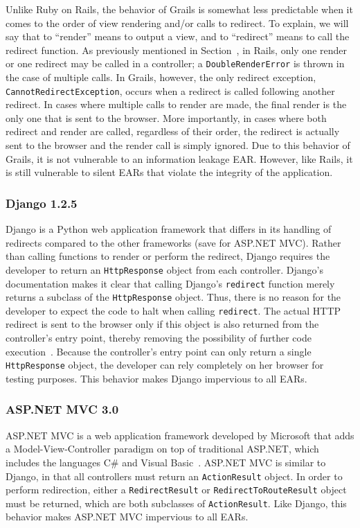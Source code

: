 Unlike Ruby on Rails, the behavior of Grails is somewhat less predictable
when it comes to the order of view rendering and/or calls to redirect. To
explain, we will say that to ``render'' means to output a view, and to
``redirect'' means to call the redirect function. As previously mentioned
in Section~, in Rails, only one render or one redirect may be
called in a controller; a \texttt{DoubleRenderError} is thrown in the case
of multiple calls. In Grails, however, the only redirect exception,
\texttt{Cannot\-Redirect\-Exception}, occurs when a redirect is called
following another redirect. In cases where multiple calls to render are
made, the final render is the only one that is sent to the browser. More
importantly, in cases where both redirect and render are called, regardless
of their order, the redirect is actually sent to the browser and the render
call is simply ignored. Due to this behavior of Grails, it is not
vulnerable to an information leakage EAR. However, like Rails, it is still
vulnerable to silent EARs that violate the integrity of the application.

\subsubsection{Django 1.2.5}
Django is a Python web application framework that differs in its handling of
redirects compared to the other frameworks (save for ASP.NET
MVC). Rather than calling functions to render or perform the redirect, Django
requires the developer to return an \texttt{HttpResponse} object from each
controller. Django's documentation makes it clear that calling Django's
\texttt{redirect} function merely returns a subclass of the
\texttt{HttpResponse} object. Thus, there is no reason for the developer to
expect the code to halt when calling \texttt{redirect}. The actual HTTP
redirect is sent to the browser only if this object is also returned from the
controller's entry point, thereby removing the possibility of further code
execution~\cite{django-redirect}. Because the controller's entry
point can only return a single \texttt{HttpResponse} object, the developer can
rely completely on her browser for testing purposes. This behavior makes
Django impervious to all EARs.

\subsubsection{ASP.NET MVC 3.0}
ASP.NET MVC is a web application framework developed by Microsoft that adds a
Model-View-Controller paradigm on top of traditional ASP.NET, which includes
the languages C\# and Visual Basic~\cite{asp-net-mvc}. ASP.NET MVC is similar
to Django, in that all controllers must return an \texttt{ActionResult}
object. In order to perform redirection, either a \texttt{RedirectResult} or
\texttt{RedirectToRouteResult} object must be returned, which are both
subclasses of \texttt{ActionResult}. Like Django, this behavior makes ASP.NET
MVC impervious to all EARs.

